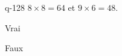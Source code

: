 \begin{truefalse}{q-128}
$8\times 8 = 64$ et $9\times 6 = 48$.
\item Vrai
\item* Faux
\end{truefalse}

